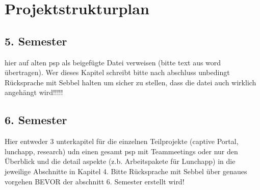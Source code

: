 \section{Projektstrukturplan}

\subsection{5. Semester}

hier auf alten psp als beigefügte Datei verweisen (bitte text aus word übertragen). Wer dieses Kapitel schreibt bitte nach abschluss unbedingt Rücksprache mit Sebbel halten um sicher zu stellen, dass die datei auch wirklich angehängt wird!!!!!

\subsection{6. Semester}

Hier entweder 3 unterkapitel für die einzelnen Teilprojekte (captive Portal, lunchapp, research) udn einen gesamt psp mit Teammeetings oder nur den Überblick und die detail aspekte (z.b. Arbeitspakete für Lunchapp) in die jeweilige Abschnitte in Kapitel 4. Bitte Rücksprache mit Sebbel über genaues vorgehen BEVOR der abschnitt 6. Semester erstellt wird!